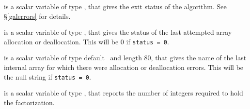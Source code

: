 \documentclass{galahad}
\newcommand{\packagename}{SBLS}
\begin{document}
\begin{description}

 is a scalar variable of type \integer, that gives the
exit status of the algorithm.
See \S\ref{galerrors}
for details.

 is a scalar variable of type \integer, that gives
the status of the last attempted array allocation or deallocation.
This will be 0 if {\tt status = 0}.

 is a scalar variable of type default \character\
and length 80, that  gives the name of the last internal array
for which there were allocation or deallocation errors.
This will be the null string if {\tt status = 0}.






 is a scalar variable of type \longinteger,
that reports the number of integers required to hold the factorization.


\end{description}
\end{document}
